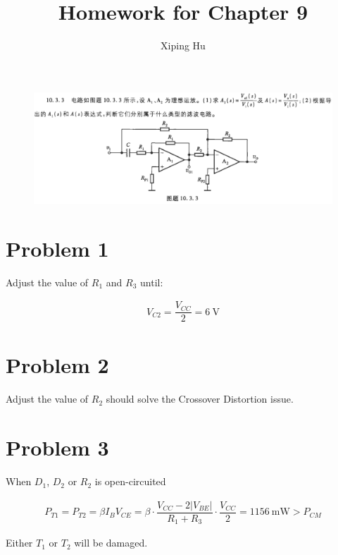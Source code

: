 \documentclass{article}
\author{Xiping Hu}
\affil{https://hxp.plus/}
\title{Homework for Chapter 9}
\newcommand{\si}[1]{\  \mathrm{#1}}
\begin{document}
\maketitle

\begin{figure}[H]
  \centering
  \includegraphics[width=\linewidth]{figures/Problem1033}
\end{figure}

\section{Problem 1}

Adjust the value of $R_1$ and $R_3$ until: 

\begin{equation*}
  \begin{aligned}
    V_{C2} = \dfrac{V_{CC}}{2} = 6 \si{V} 
  \end{aligned}
\end{equation*}

\section{Problem 2}

Adjust the value of $R_2$ should solve the Crossover Distortion issue.

\section{Problem 3}

When $D_1$, $D_2$ or $R_2$ is open-circuited

\begin{equation*}
  \begin{aligned}
    P_{T1} = P_{T2} = \beta I_B V_{CE} = \beta \cdot \dfrac{V_{CC} - 2 |V_{BE}|}{R_1 + R_3} \cdot \dfrac{V_{CC}}{2} = 1156 \si{mW} > P_{CM}  
  \end{aligned}
\end{equation*}

Either $T_1$ or $T_2$ will be damaged.
\end{document}
